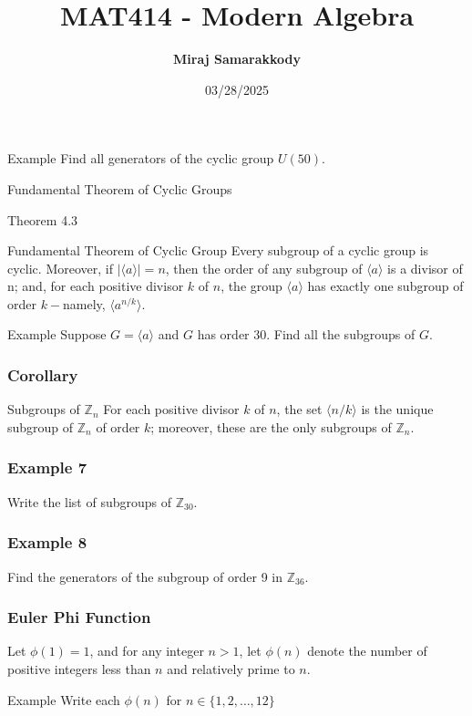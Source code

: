 \documentclass{beamer}
\title{MAT414 - Modern Algebra}
\author{\textbf{Miraj Samarakkody}}
\institute{Tougaloo College}
\date{03/28/2025}
\begin{document}
\begin{frame}
    \titlepage
\end{frame}

    \begin{frame}{Example}
    Find all generators of the cyclic group \(U(50)\).
    \end{frame}

    \begin{frame}{}
    \begin{center}
        \Huge{Fundamental Theorem of Cyclic Groups}
    \end{center}
    \end{frame}

    \begin{frame}{Theorem 4.3}
    \begin{block}{Fundamental Theorem of Cyclic Group}
        Every subgroup of a cyclic group is cyclic. Moreover, if \(|\langle a \rangle|=n\), then  the order of any subgroup of \(\langle a\rangle\) is a divisor of n; and, for each positive divisor \(k\) of \(n\), the group \(\langle a\rangle\) has exactly one subgroup of order \(k-\)namely, \(\langle a^{n/k}\rangle\). 
    \end{block}
    \end{frame}

    \begin{frame}{Example}
        Suppose \(G=\langle a\rangle\) and \(G\) has order 30. Find all the subgroups of \(G\).
    
    \end{frame}

    \begin{frame}
        \frametitle{Corollary}
        \begin{block}{Subgroups of \(\mathbb{Z}_n\)}
        For each positive divisor \(k\) of \(n\), the set \(\langle n/k\rangle\) is the unique subgroup of \(\mathbb{Z}_n\) of order \(k\); moreover, these are the only subgroups of \(\mathbb{Z}_n\).    
        \end{block}
    \end{frame}

    \begin{frame}
        \frametitle{Example 7}
    Write the list of subgroups of \(\mathbb{Z}_{30}\). 
    \end{frame}

\begin{frame}
    \frametitle{Example 8}
Find the generators of the subgroup of order 9 in \(\mathbb{Z}_{36}\). 
    

\end{frame}


\begin{frame}
    \frametitle{Euler Phi Function}
Let \(\phi(1)=1\), and for any integer \(n>1\), let \(\phi(n)\) denote the number of positive integers less than \(n\) and relatively prime to \(n\). 

\begin{block}{Example} Write each \(\phi(n)\) for \(n \in \{1,2, \dots, 12\}\)
    
\end{block}
    

\end{frame}
\end{document}
